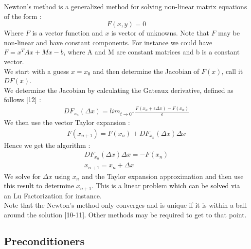 \documentclass[11pt,twoside,a4paper]{article}
\begin{document}
Newton's method is a generalized method for solving non-linear matrix equations of the form :
$$
F(x,y) = 0
$$
Where $F$ is a vector function and $x$ is vector of unknowns. Note that $F$ may be non-linear and have constant components.
For instance we could have $ F = x^T A x + M x - b$, where A and M are constant matrices and b is a constant vector.\\
We start with a guess $x = x_0$ and then determine the Jacobian of $F(x)$, call it $DF(x)$.\\
We determine the Jacobian by calculating the Gateaux derivative, defined as follows [12] :
\begin{align}
DF_{x_n}(\Delta x) = lim_{t \rightarrow 0^+} \frac{F(x_n+ \epsilon \Delta x) - F(x_n)}{\epsilon}
\end{align}
We then use the vector Taylor expansion :
\begin{align*}
F(x_{n+1}) = F(x_n) + DF_{x_n}(\Delta x) \Delta x
\end{align*}
Hence we get the algorithm :
\begin{align}
DF_{x_n}(\Delta x) \Delta x = - F(x_n)\\
x_{n+1} = x_n + \Delta x
\end{align}
We solve for $\Delta x$ using $x_n$ and the Taylor expansion approximation and then use this result to determine $x_{n+1}$.
This is a linear problem which can be solved via an Lu Factorization for instance.\\
Note that the Newton's method only converges and is unique if it is within a ball around the solution [10-11]. Other methods may be required to get to that point.

\subsection{Preconditioners}
\end{document}
